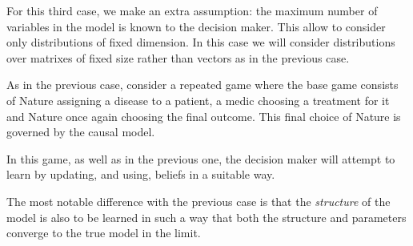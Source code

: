 \documentclass{article}
\begin{document}
For this third case, we make an extra assumption: the maximum number of variables in the model is known to the decision maker. This allow to consider only distributions of fixed dimension. In this case we will consider distributions over matrixes of fixed size rather than vectors as in the previous case. 

As in the previous case, consider a repeated game where the base game consists of Nature assigning a disease to a patient, a medic choosing a treatment for it and Nature once again choosing the final outcome. This final choice of Nature is governed by the causal model.

In this game, as well as in the previous one, the decision maker will attempt to learn by updating, and using, beliefs in a suitable way. 

The most notable difference with the previous case is that the \textit{structure} of the model is also to be learned in such a way that both the structure and parameters converge to the true model in the limit. 




\end{document}
